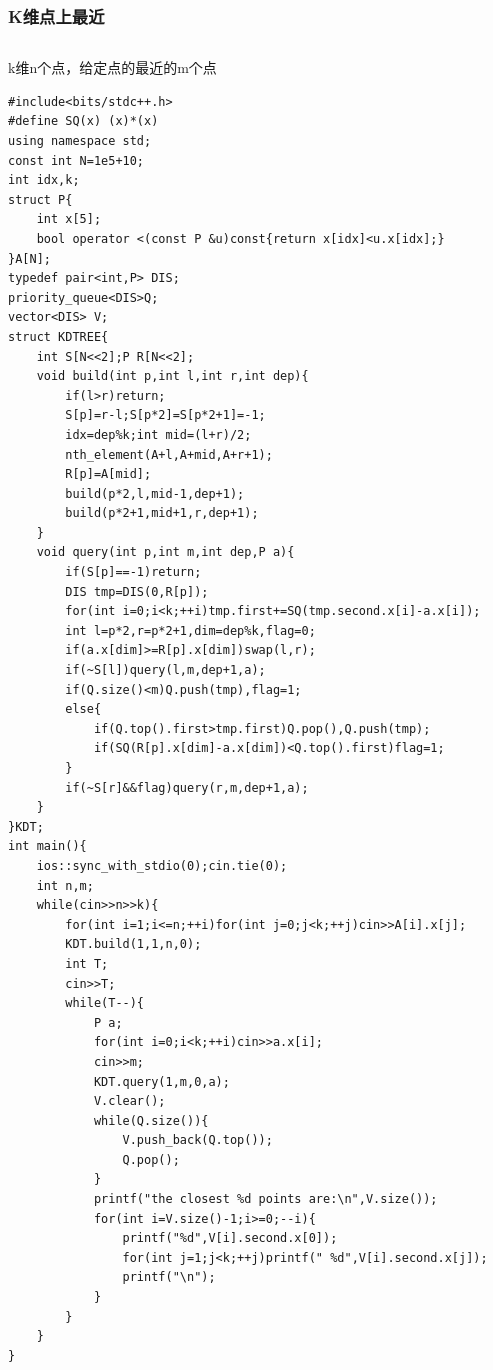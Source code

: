 \documentclass[twoside]{article}
\begin{document}
\subsubsection{K维点上最近}
\begin{lstlisting}
\end{lstlisting}
k维n个点，给定点的最近的m个点
\begin{lstlisting}
#include<bits/stdc++.h>
#define SQ(x) (x)*(x)
using namespace std;
const int N=1e5+10;
int idx,k;
struct P{
	int x[5];
	bool operator <(const P &u)const{return x[idx]<u.x[idx];}
}A[N];
typedef pair<int,P> DIS;
priority_queue<DIS>Q;
vector<DIS> V;
struct KDTREE{
	int S[N<<2];P R[N<<2];
	void build(int p,int l,int r,int dep){
		if(l>r)return;
		S[p]=r-l;S[p*2]=S[p*2+1]=-1;
		idx=dep%k;int mid=(l+r)/2;
		nth_element(A+l,A+mid,A+r+1);
		R[p]=A[mid];
		build(p*2,l,mid-1,dep+1);
		build(p*2+1,mid+1,r,dep+1);
	}
	void query(int p,int m,int dep,P a){
		if(S[p]==-1)return;
		DIS tmp=DIS(0,R[p]);
		for(int i=0;i<k;++i)tmp.first+=SQ(tmp.second.x[i]-a.x[i]);
		int l=p*2,r=p*2+1,dim=dep%k,flag=0;
		if(a.x[dim]>=R[p].x[dim])swap(l,r);
		if(~S[l])query(l,m,dep+1,a);
		if(Q.size()<m)Q.push(tmp),flag=1;
		else{
			if(Q.top().first>tmp.first)Q.pop(),Q.push(tmp);
			if(SQ(R[p].x[dim]-a.x[dim])<Q.top().first)flag=1;
		}
		if(~S[r]&&flag)query(r,m,dep+1,a);
	}
}KDT;
int main(){
	ios::sync_with_stdio(0);cin.tie(0);
	int n,m;
	while(cin>>n>>k){
		for(int i=1;i<=n;++i)for(int j=0;j<k;++j)cin>>A[i].x[j];
		KDT.build(1,1,n,0);
		int T;
		cin>>T;
		while(T--){
			P a;
			for(int i=0;i<k;++i)cin>>a.x[i];
			cin>>m;
			KDT.query(1,m,0,a);
			V.clear();
			while(Q.size()){
				V.push_back(Q.top());
				Q.pop();
			}
			printf("the closest %d points are:\n",V.size());
			for(int i=V.size()-1;i>=0;--i){
				printf("%d",V[i].second.x[0]);
				for(int j=1;j<k;++j)printf(" %d",V[i].second.x[j]);
				printf("\n");
			}
		}
	}
}\end{lstlisting}
\end{document}
